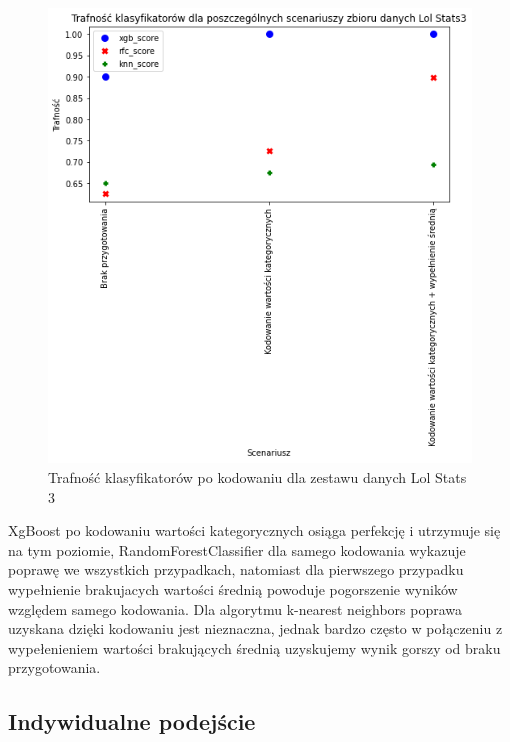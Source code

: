 \documentclass{book}
\begin{document}
\begin{figure}[H]
\centerline{\includegraphics{Lol_Stats_3_Kodowanie}}
\centering
\caption{Trafność klasyfikatorów po kodowaniu dla zestawu danych Lol Stats 3}
\end{figure}

XgBoost po kodowaniu wartości kategorycznych osiąga perfekcję i utrzymuje się na tym poziomie, 
RandomForestClassifier dla samego kodowania wykazuje poprawę we wszystkich przypadkach, 
natomiast dla pierwszego przypadku wypełnienie brakujacych wartości średnią powoduje 
pogorszenie wyników względem samego kodowania. Dla algorytmu k-nearest neighbors poprawa uzyskana 
dzięki kodowaniu jest nieznaczna, jednak bardzo często w połączeniu z wypełenieniem wartości brakujących 
średnią uzyskujemy wynik gorszy od braku przygotowania.

\subsection{Indywidualne podejście}
\end{document}
